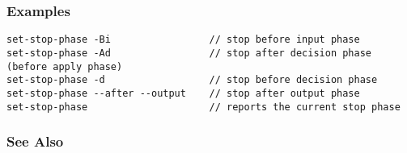 \subsubsection*{Examples}
\begin{verbatim}
set-stop-phase -Bi                 // stop before input phase
set-stop-phase -Ad                 // stop after decision phase (before apply phase)
set-stop-phase -d                  // stop before decision phase
set-stop-phase --after --output    // stop after output phase
set-stop-phase                     // reports the current stop phase
\end{verbatim}
\subsubsection*{See Also}
